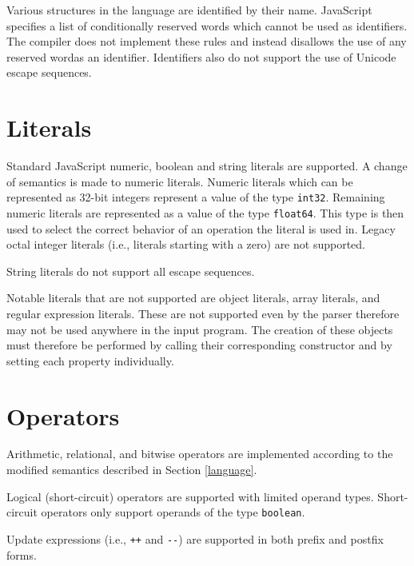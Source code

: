 Various structures in the language are identified by their name. JavaScript specifies a list of conditionally reserved words which cannot be used as identifiers. The compiler does not implement these rules and instead disallows the use of any reserved word\footnotemark[1] as an identifier. Identifiers also do not support the use of Unicode escape sequences.



\section{Literals}

Standard JavaScript numeric, boolean and string literals are supported. A change of semantics is made to numeric literals. Numeric literals which can be represented as 32-bit integers represent a value of the type \texttt{int32}. Remaining numeric literals are represented as a value of the type \texttt{float64}. This type is then used to select the correct behavior of an operation the literal is used in. Legacy octal integer literals (i.e., literals starting with a zero) are not supported.

String literals do not support all escape sequences.

Notable literals that are not supported are object literals, array literals, and regular expression literals. These are not supported even by the parser therefore may not be used anywhere in the input program. The creation of these objects must therefore be performed by calling their corresponding constructor and by setting each property individually.


\section{Operators}

Arithmetic, relational, and bitwise operators are implemented according to the modified semantics described in Section \ref{language}.

Logical (short-circuit) operators are supported with limited operand types. Short-circuit operators only support operands of the type \texttt{boolean}.

Update expressions (i.e., \texttt{++} and \texttt{{-}{-}}) are supported in both prefix and postfix forms.

